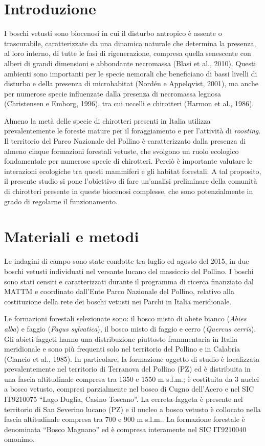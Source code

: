 \begin{multicols}{2}

\section*{Introduzione}
I boschi vetusti sono biocenosi in cui il disturbo antropico è assente o trascurabile, caratterizzate da una dinamica naturale che determina la presenza, al loro interno, di tutte le fasi di rigenerazione, compresa quella senescente con alberi di grandi dimensioni e abbondante necromassa (Blasi et al., 2010). Questi ambienti sono importanti per  le specie nemorali che beneficiano di bassi livelli di disturbo e della presenza di microhabitat (Nordén e Appelqvist, 2001), ma anche per numerose specie influenzate dalla presenza di necromassa legnosa (Christensen e Emborg, 1996), tra cui uccelli e chirotteri (Harmon et al., 1986).   

Almeno la metà delle specie di chirotteri presenti in Italia utilizza prevalentemente le foreste mature per il foraggiamento e per l’attività di \textit{roosting}. Il territorio del Parco Nazionale del Pollino è caratterizzato dalla presenza di almeno cinque formazioni forestali vetuste, che svolgono un ruolo ecologico fondamentale per numerose specie di chirotteri. Perciò è importante valutare le interazioni ecologiche tra questi mammiferi e gli habitat forestali. A tal proposito, il presente studio si pone l’obiettivo di fare un’analisi preliminare della comunità di chirotteri presente in queste biocenosi complesse, che sono potenzialmente in grado di regolarne il funzionamento.   

\section*{Materiali e metodi}
Le indagini di campo sono state condotte tra luglio ed agosto del 2015, in due boschi vetusti individuati nel versante lucano del massiccio del Pollino. I boschi sono stati censiti e caratterizzati durante il programma di ricerca finanziato dal MATTM e coordinato dall’Ente Parco Nazionale del Pollino, relativo alla costituzione della rete dei boschi vetusti nei Parchi in Italia meridionale.

Le formazioni forestali selezionate sono: il bosco misto di abete bianco (\emph{Abies alba}) e faggio (\emph{Fagus sylvatica}), il bosco misto di faggio e cerro (\emph{Quercus cerris}). Gli abieti-faggeti hanno una distribuzione piuttosto frammentaria in Italia meridionale e sono più frequenti solo nel territorio del Pollino e in Calabria (Ciancio et al., 1985). In particolare, la formazione oggetto di studio è localizzata prevalentemente nel territorio di Terranova del Pollino (PZ) ed è distribuita in una fascia altitudinale compresa tra 1350 e 1550 m s.l.m.; è costituita da 3 nuclei a bosco vetusto, compresi parzialmente nel bosco di Cugno dell’Acero e nel SIC IT9210075 ``Lago Duglia, Casino Toscano''. La cerreta-faggeta è presente nel territorio di San Severino lucano (PZ) e il nucleo a bosco vetusto è collocato nella fascia altitudinale compresa tra 700 e 900 m s.l.m.. La formazione forestale è denominata ``Bosco Magnano'' ed è compresa interamente nel SIC IT9210040 omonimo.


\end{multicols}
